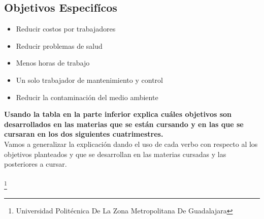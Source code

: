 \documentclass[11pt,a4paper]{article}
\begin{document}
\subsection{Objetivos Especifícos}
\begin{itemize}
\item Reducir costos por trabajadores
\item Reducir problemas de salud
\item Menos horas de trabajo
\item Un solo trabajador de mantenimiento y control
\item Reducir la contaminación del medio ambiente 
\end{itemize}

\textbf{Usando la tabla en la parte inferior explica cuáles objetivos son desarrollados en las materias que se están cursando y en las que se cursaran en los dos siguientes cuatrimestres.}\\
Vamos a generalizar la explicación dando el uso de cada verbo con respecto al los objetivos planteados y que se desarrollan en las materias cursadas y las posteriores a cursar.\\\\
\footnote{Universidad Politécnica De La Zona Metropolitana De Guadalajara} 
\end{document}
